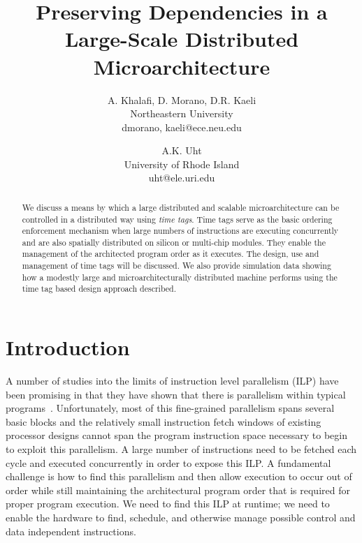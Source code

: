 \documentclass[10pt,dvips]{article}
\begin{document}
\parskip 2mm
%
%
\title{Preserving Dependencies in a Large-Scale Distributed 
Microarchitecture}
%
\author{
A. Khalafi, D. Morano, D.R. Kaeli\\
Northeastern University\\
dmorano, kaeli@ece.neu.edu\\
\and
A.K. Uht\\
University of Rhode Island\\ 
uht@ele.uri.edu
}
%
\date{}
%
\maketitle
%
%
%
\begin{abstract}
We discuss a means by which a large distributed and scalable
microarchitecture can be controlled in a distributed way using
{\em time tags}.  Time tags serve as the basic ordering enforcement mechanism
when large numbers of instructions are executing concurrently and
are also spatially distributed on silicon or multi-chip modules.
They enable the management of the architected program order as
it executes.  The design, use and management of time tags will
be discussed.  We also provide simulation data showing how a modestly large
and microarchitecturally distributed machine performs using
the time tag based design approach described.
\end{abstract}
%
%
\section{Introduction}
%
A number of studies into the limits of 
instruction level parallelism (ILP) have
been promising in that they have shown that there is parallelism within
typical programs~\cite{Gon97,Lam92,Uht95}.  
Unfortunately, most of this fine-grained
parallelism spans several basic blocks and the relatively small
instruction fetch windows of existing processor designs cannot span
the program instruction space necessary to begin to exploit this
parallelism.  A large number of instructions need to be fetched
each cycle and executed concurrently in order to expose this ILP.
A fundamental challenge 
is how to find this parallelism and then allow execution to occur
out of order  
while still maintaining the architectural program order that
is required for proper program execution.
We need to find this ILP at runtime; we need to 
enable the hardware to find, schedule,
and otherwise manage possible control and data independent instructions.
\end{document}
